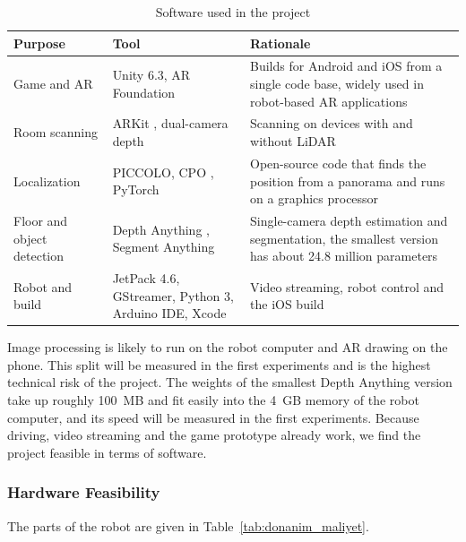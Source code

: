 \documentclass[11pt,a4paper]{article}
\begin{document}
\begin{table}[H]
\centering
\caption{Software used in the project}
\label{tab:yazilim_araclari}
\small
\begin{tabularx}{\linewidth}{>{\raggedright\arraybackslash}p{2.9cm} >{\raggedright\arraybackslash}p{5cm} >{\raggedright\arraybackslash}X}
\toprule
\textbf{Purpose} & \textbf{Tool} & \textbf{Rationale} \\
\midrule
Game and AR & Unity 6.3, AR Foundation & Builds for Android and iOS from a single code base, widely used in robot-based AR applications \cite{coronado2023integrating} \\
Room scanning & ARKit \cite{apple2026arkit}, dual-camera depth \cite{zhang2020dunet} & Scanning on devices with and without LiDAR \\
Localization & PICCOLO, CPO \cite{kim2021piccolo,kim2022cpo}, PyTorch & Open-source code that finds the position from a panorama and runs on a graphics processor \\
Floor and object detection & Depth Anything \cite{yang2024depthanything}, Segment Anything \cite{kirillov2023sam} & Single-camera depth estimation and segmentation, the smallest version has about 24.8 million parameters \\
Robot and build & JetPack 4.6, GStreamer, Python 3, Arduino IDE, Xcode & Video streaming, robot control and the iOS build \\
\bottomrule
\end{tabularx}
\end{table}

Image processing is likely to run on the robot computer and AR drawing on the phone. This split will be measured in the first experiments and is the highest technical risk of the project. The weights of the smallest Depth Anything version take up roughly 100~MB and fit easily into the 4~GB memory of the robot computer, and its speed will be measured in the first experiments. Because driving, video streaming and the game prototype already work, we find the project feasible in terms of software.

\newpage
\subsubsection{Hardware Feasibility}
\label{subsubsec:donanim_fizibilitesi}
The parts of the robot are given in Table~\ref{tab:donanim_maliyet}.
\end{document}
